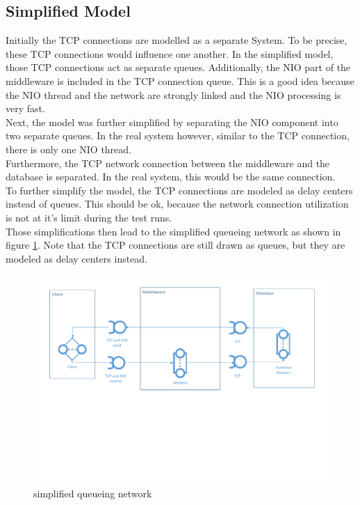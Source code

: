 \documentclass[a4paper]{article}
\begin{document}
\subsection{Simplified Model}

Initially the TCP connections are modelled as a separate System. To be precise, these TCP connections would influence one another. In the simplified model, those TCP connections act as separate queues. Additionally, the NIO part of the middleware is included in the TCP connection queue. This is a good idea because the NIO thread and the network are strongly linked and the NIO processing is very fast.\\

Next, the model was further simplified by separating the NIO component into two separate queues. In the real system however, similar to the TCP connection, there is only one NIO thread.\\

Furthermore, the TCP network connection between the middleware and the database is separated. In the real system, this would be the same connection.\\

To further simplify the model, the TCP connections are modeled as delay centers instead of queues. This should be ok, because the network connection utilization is not at it's limit during the test runs.\\

Those simplifications then lead to the simplified queueing network as shown in figure \ref{fig:simplified-queueing-network}. Note that the TCP connections are still drawn as queues, but they are modeled as delay centers instead.\\


\begin{figure}[H]
	\begin{center}
    \includegraphics[scale=0.6, trim = 15mm 94mm 12mm 10mm, clip]{../drawings-ms2le/simplified-queueing-network.pdf}
  \end{center}
  \caption{simplified queueing network}
  \label{fig:simplified-queueing-network}
\end{figure}
\end{document}
